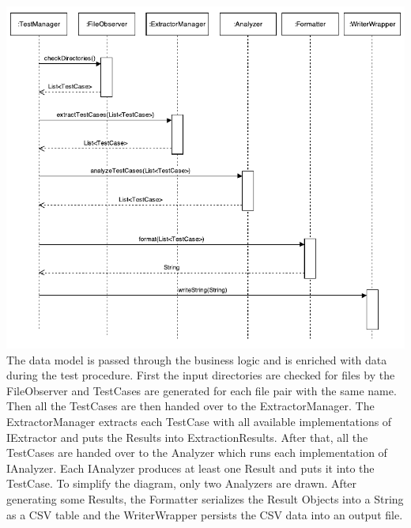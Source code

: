 \includegraphics[width=15cm]{Figures/activityDiagram.pdf}
The data model is passed through the business logic and is enriched with data during the test procedure. First the input directories are checked for files by the FileObserver and TestCases are generated for each file pair with the same name. Then all the TestCases are then handed over to the ExtractorManager. The ExtractorManager extracts each TestCase with all available implementations of IExtractor and puts the Results into ExtractionResults. After that, all the TestCases are handed over to the Analyzer which runs each implementation of IAnalyzer. Each IAnalyzer produces at least one Result and puts it into the TestCase. To simplify the diagram, only two Analyzers are drawn. After generating some Results, the Formatter serializes the Result Objects into a String as a CSV table and the WriterWrapper persists the CSV data into an output file.



